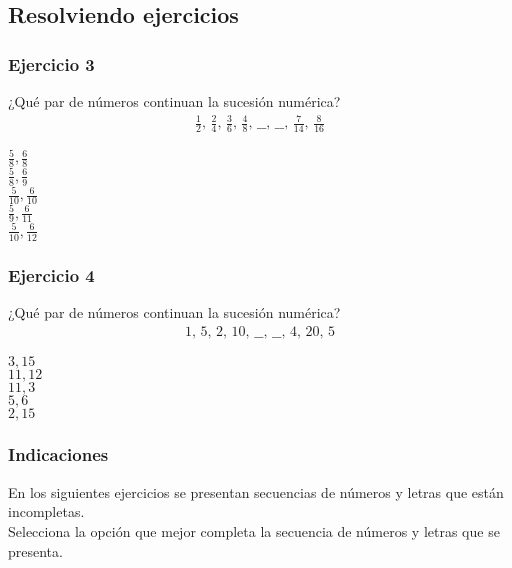 \subsection{Resolviendo ejercicios}

\begin{frame}
\frametitle{Ejercicio 3}
¿Qué par de números continuan la sucesión numérica?
\begin{align*}
\frac{1}{2}, \, \frac{2}{4}, \, \frac{3}{6}, \, \frac{4}{8}, \, \_\_ , \, \_\_, \, \frac{7}{14}, \, \frac{8}{16}
\end{align*}
\begin{choices}
\choice $\frac{5}{8}, \frac{6}{8}$ \\
\choice $\frac{5}{8}, \frac{6}{9}$ \\
\choice $\frac{5}{10}, \frac{6}{10}$ \\
\choice $\frac{5}{9}, \frac{6}{11}$ \\
\choice $\frac{5}{10}, \frac{6}{12}$ \\
\end{choices}
\pause
{}
\end{frame}
\begin{frame}
\frametitle{Ejercicio 4}
¿Qué par de números continuan la sucesión numérica?
\begin{align*}
1, \, 5, \, 2, \, 10, \, \_\_ , \, \_\_, \, 4, \, 20, \, 5
\end{align*}
\begin{choices}
\choice $3, 15$ \\
\choice $11, 12$ \\
\choice $11, 3$ \\
\choice $5, 6$ \\
\choice $2, 15$ \\
\end{choices}
\pause
{}
\end{frame}
\begin{frame}
\frametitle{Indicaciones}
En los siguientes ejercicios se presentan  secuencias de números y letras que están incompletas.
\\
\bigskip
\pause
Selecciona la opción que mejor completa la secuencia de números y letras que se presenta.
\end{frame}
